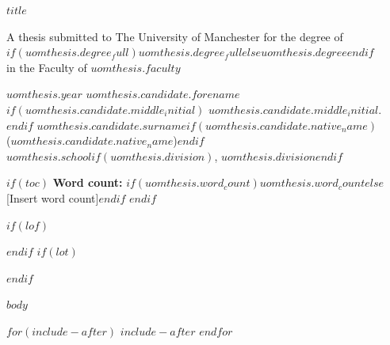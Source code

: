 \documentclass[$if(fontsize)$$fontsize$,$endif$a4paper]{report}
\begin{document}
\begin{titlepage}
\centering
\vspace*{6cm}
{\Large\bfseries $title$\par}
\vspace{3cm}
A thesis submitted to The University of Manchester for the degree of\\
$if(uomthesis.degree_full)$$uomthesis.degree_full$$else$$uomthesis.degree$$endif$\\
in the Faculty of $uomthesis.faculty$
\vspace{3cm}

$uomthesis.year$
\vfill
$uomthesis.candidate.forename$$if(uomthesis.candidate.middle_initial)$ $uomthesis.candidate.middle_initial$.$endif$ $uomthesis.candidate.surname$$if(uomthesis.candidate.native_name)$\\($uomthesis.candidate.native_name$)$endif$\\
$uomthesis.school$$if(uomthesis.division)$, $uomthesis.division$$endif$
\end{titlepage}

$if(toc)$
\setcounter{tocdepth}{$toc-depth$}
\tableofcontents
\vspace*{\fill}
\noindent\hfill\textbf{Word count:} $if(uomthesis.word_count)$$uomthesis.word_count$$else$[Insert word count]$endif$
\clearpage
$endif$

$if(lof)$\listoffigures$endif$
$if(lot)$\listoftables$endif$

$body$

$for(include-after)$
$include-after$
$endfor$
\end{document}
